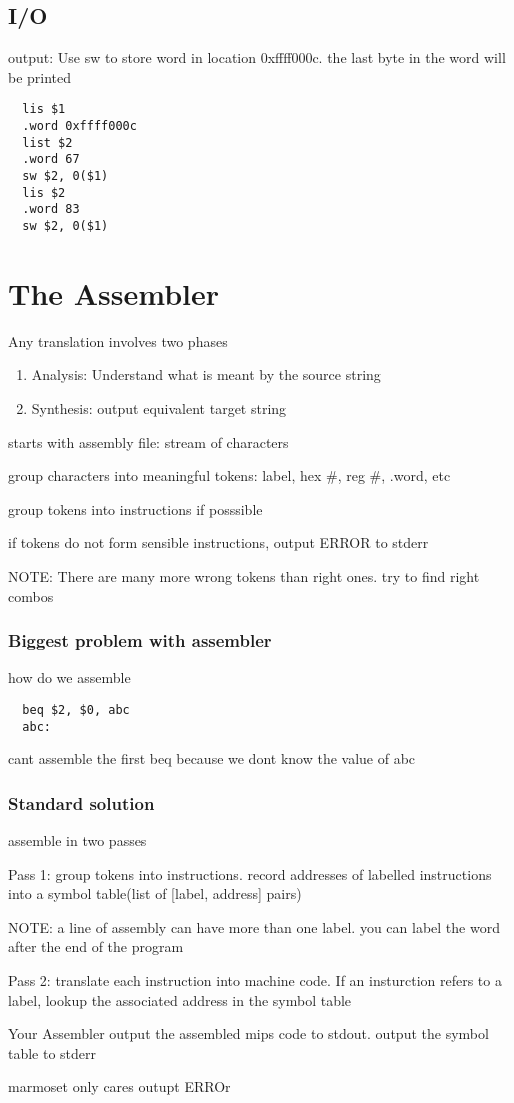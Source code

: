 \documentclass[11pt]{amsart}
\begin{document}
\subsection{I/O}
\par output:  Use sw to store word in location 0xffff000c. the last byte in the
word will be printed
\begin{verbatim}
  lis $1
  .word 0xffff000c
  list $2
  .word 67
  sw $2, 0($1)
  lis $2
  .word 83
  sw $2, 0($1)
\end{verbatim}
\section{The Assembler}
\par Any translation involves two phases
\begin{enumerate}
  \item Analysis: Understand what is meant by the source string
  \item Synthesis: output equivalent target string
\end{enumerate}
\par starts with assembly file: stream of characters
\begin{enumerate*}
\item group characters into meaningful tokens: label, hex #, reg #, .word, etc
\item group tokens into instructions if posssible
\item if tokens do not form sensible instructions, output ERROR to stderr
\item NOTE: There are many more wrong tokens than right ones. try to find right
  combos
\end {enumerate*}
\subsubsection{Biggest problem with assembler}
\par how do we assemble
\begin{verbatim}
  beq $2, $0, abc
  abc:
\end{verbatim}
\par cant assemble the first beq because we dont know the value of abc
\subsubsection{Standard solution}
\par assemble in two passes
\par Pass 1: group tokens into instructions. record addresses of labelled
instructions into a symbol table(list of [label, address] pairs)
\par NOTE: a line of assembly can have more than one label. you can label the
word after the end of the program
\par Pass 2: translate each instruction into machine code. If an insturction
refers to a label, lookup the associated address in the symbol table
\par Your Assembler output the assembled mips code to stdout. output the symbol
table to stderr
\par marmoset only cares outupt ERROr
\end{document}
